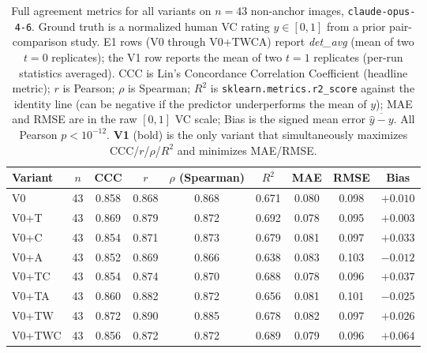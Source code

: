 \begin{table}[t]
  \centering
  \caption{Full agreement metrics for all variants on $n = 43$
    non-anchor images, \texttt{claude-opus-4-6}. Ground truth is a
    normalized human VC rating $y \in [0,1]$ from a prior
    pair-comparison study. E1 rows (V0 through V0+TWCA) report
    \emph{det\_avg} (mean of two $t = 0$ replicates); the V1 row
    reports the mean of two $t = 1$ replicates (per-run statistics
    averaged). CCC is Lin's Concordance Correlation Coefficient
    (headline metric); $r$ is Pearson; $\rho$ is Spearman; $R^2$ is
    \texttt{sklearn.metrics.r2\_score} against the identity line
    (can be negative if the predictor underperforms the mean of $y$);
    MAE and RMSE are in the raw $[0,1]$ VC scale; Bias is the signed
    mean error $\overline{\hat{y} - y}$. All Pearson $p < 10^{-12}$.
    \textbf{V1} (bold) is the only variant that simultaneously
    maximizes CCC/$r$/$\rho$/$R^2$ and minimizes MAE/RMSE.}
  \label{tab:full}
  \small
  \begin{tabular*}{\textwidth}{@{\extracolsep{\fill}}lcccccccc@{}}
    \toprule
    Variant & $n$ & CCC & $r$ & $\rho$ (Spearman) & $R^2$ & MAE & RMSE & Bias\\
    \midrule
    V0          & 43 & 0.858          & 0.868          & 0.868          & 0.671          & 0.080          & 0.098          & $+0.010$\\
    V0+T        & 43 & 0.869          & 0.879          & 0.872          & 0.692          & 0.078          & 0.095          & $+0.003$\\
    V0+C        & 43 & 0.854          & 0.871          & 0.873          & 0.679          & 0.081          & 0.097          & $+0.033$\\
    V0+A        & 43 & 0.852          & 0.869          & 0.866          & 0.638          & 0.083          & 0.103          & $-0.012$\\
    V0+TC       & 43 & 0.854          & 0.874          & 0.870          & 0.688          & 0.078          & 0.096          & $+0.037$\\
    V0+TA       & 43 & 0.860          & 0.882          & 0.872          & 0.656          & 0.081          & 0.101          & $-0.025$\\
    V0+TW       & 43 & 0.872          & 0.890          & 0.885          & 0.678          & 0.082          & 0.097          & $+0.026$\\
    V0+TWC      & 43 & 0.856          & 0.872          & 0.872          & 0.689          & 0.079          & 0.096          & $+0.064$\\

\end{tabular*}
\end{table}
